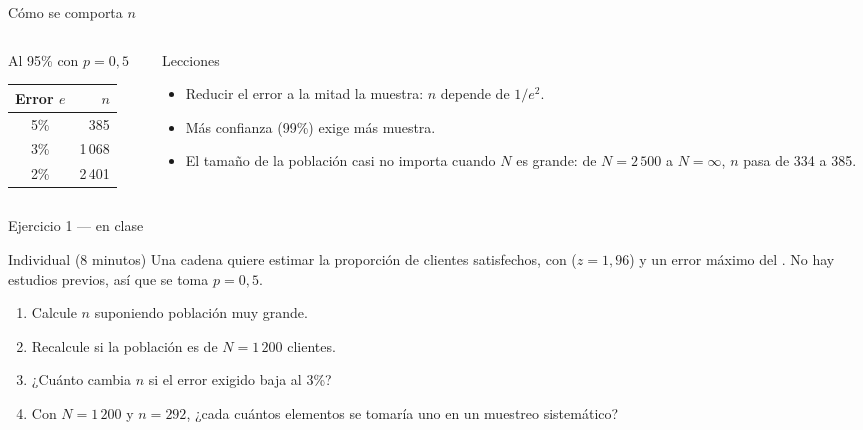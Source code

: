 \documentclass[aspectratio=169,10pt]{beamer}
\begin{document}
\begin{frame}{Cómo se comporta $n$}
  \begin{columns}[T,onlytextwidth]
    \begin{column}{0.48\textwidth}
      \begin{exampleblock}{Al 95\% con $p=0{,}5$}
        \footnotesize
        \begin{center}
        \begin{tabular}{@{}cr@{}}
          \toprule
          Error $e$ & $n$ \\
          \midrule
          5\% & 385 \\
          3\% & 1\,068 \\
          2\% & 2\,401 \\
          \bottomrule
        \end{tabular}
        \end{center}
      \end{exampleblock}
    \end{column}
    \begin{column}{0.48\textwidth}
      \begin{alertblock}{Lecciones}
        \footnotesize
        \begin{itemize}
          \item Reducir el error a la mitad  la muestra:
                $n$ depende de $1/e^{2}$.
          \item Más confianza (99\%) exige más muestra.
          \item El tamaño de la población casi no importa cuando $N$ es grande:
                de $N=2\,500$ a $N=\infty$, $n$ pasa de 334 a 385.
        \end{itemize}
      \end{alertblock}
    \end{column}
  \end{columns}
\end{frame}

\begin{frame}{Ejercicio 1 — en clase}
  \begin{alertblock}{Individual (8 minutos)}
    Una cadena quiere estimar la proporción de clientes satisfechos, con
     ($z=1{,}96$) y un error máximo del
    . No hay estudios previos, así que se toma $p=0{,}5$.

    \vspace{0.25cm}
    \begin{enumerate}
      \item Calcule $n$ suponiendo población muy grande.
      \item Recalcule si la población es de $N=1\,200$ clientes.
      \item ¿Cuánto cambia $n$ si el error exigido baja al 3\%?
      \item Con $N=1\,200$ y $n=292$, ¿cada cuántos elementos se tomaría uno en
            un muestreo sistemático?
    \end{enumerate}
  \end{alertblock}
\end{frame}
\end{document}
